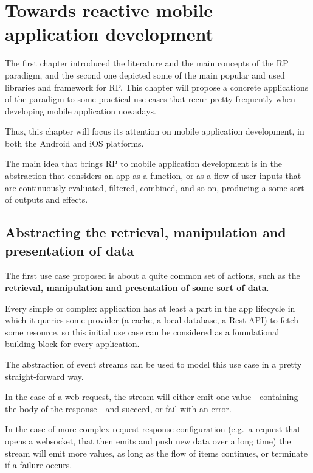 \chapter{Towards reactive mobile application development}\label{towards-reactive-mobile-application-development}

The first chapter introduced the literature and the main concepts of the
RP paradigm, and the second one depicted some of the main popular and
used libraries and framework for RP. This chapter will propose a
concrete applications of the paradigm to some practical use cases that
recur pretty frequently when developing mobile application nowadays.

Thus, this chapter will focus its attention on mobile application
development, in both the Android and iOS platforms.

The main idea that brings RP to mobile application development is in the
abstraction that considers an app as a function, or as a flow of user
inputs that are continuously evaluated, filtered, combined, and so on,
producing a some sort of outputs and effects.


\section{Abstracting the retrieval, manipulation and presentation of
data}\label{abstracting-the-retrieval-manipulation-and-presentation-of-data}

The first use case proposed is about a quite common set of actions, such
as the \textbf{retrieval, manipulation and presentation of some sort of
data}.

Every simple or complex application has at least a part in the app
lifecycle in which it queries some provider (a cache, a local database,
a Rest API) to fetch some resource, so this initial use case can be
considered as a foundational building block for every application.

The abstraction of event streams can be used to model this use case in a
pretty straight-forward way.

In the case of a web request, the stream will either emit one value -
containing the body of the response - and succeed, or fail with an error.

In the case of more complex request-response configuration (e.g.~a
request that opens a websocket, that then emits and push new data over
a long time) the stream will emit more values, as long as the flow of
items continues, or terminate if a failure occurs.

